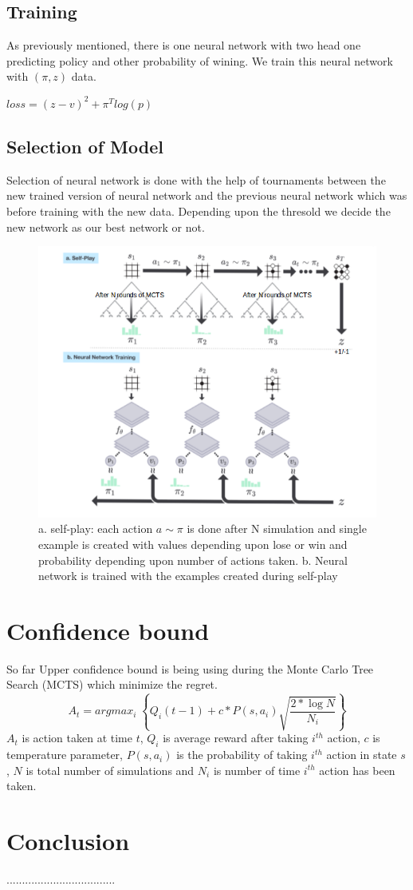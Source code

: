 \subsection{Training}
As previously mentioned, there is one neural network with two head one predicting policy and other probability of wining. We train this neural network with $(\pi,z)$ data. 


$loss = (z-v)^{2} + \pi^{T}log(p)$ 
\subsection{Selection of Model}
Selection of neural network is done with the help of tournaments between the new trained version of neural network and the previous neural network which was before training with the new data. Depending upon the thresold we decide the new network as our best network or not.

\begin{figure}
    [!htb]\centering
    \includegraphics[width=6in]{images/selfplay.png}
    \caption{a. self-play: each action $a \sim \pi $ is done after N simulation and single example is created with values depending upon lose or win and probability depending upon number of actions taken. b. Neural network is trained with the examples created during self-play  }
  \label{fig:phase}
  \end{figure}

\section{Confidence bound}
So far Upper confidence bound is being using during the Monte Carlo Tree Search (MCTS)\cite{mcts} which minimize the regret.$$ A_{t} = argmax_{i}\; \left \lbrace Q_{i}(t-1) + c*P(s,a_{i}) \sqrt{\dfrac{2* \log N}{N_{i}}} \right \rbrace $$
$A_{t}$ is action taken at time $t$, $Q_{i}$ is average reward after taking $i^{th}$ action, $c$ is temperature parameter, $P(s,a_{i})$ is the probability of taking $i^{th}$ action in state $s$, $N$ is total number of simulations and $N_{i}$ is number of time $i^{th}$ action has been taken.



\section{Conclusion}
...................................




